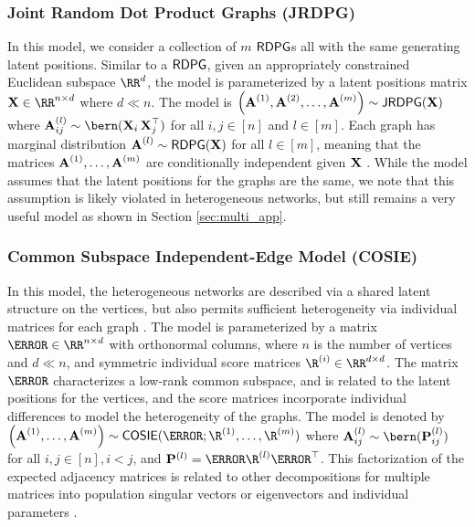 \subsubsection{Joint Random Dot Product Graphs (JRDPG)}
In this model, we consider a collection of $m$ $\operatorname{\mathsf{RDPG}}$s all with the same generating latent positions. Similar to a $\operatorname{\mathsf{RDPG}}$, given an appropriately constrained Euclidean subspace $\RR^d$, the model is parameterized by a latent positions matrix $\X\in\RR^{n\times d}$ where $d \ll n$. The model is $\left(\operatorname{\mathbf{A}}^{(1)}, \operatorname{\mathbf{A}}^{(2)}, \ldots, \operatorname{\mathbf{A}}^{(m)}\right)\sim \operatorname{\mathsf{JRDPG}}(\operatorname{\mathbf{X}})$ where $\A_{ij}^{(l)}\sim \bern(\X_i\X_j^\top)$ for all $i, j \in [n]$ and $l\in [m]$. Each graph has marginal distribution $\operatorname{\mathbf{A}}^{(l)}\sim\operatorname{\mathsf{RDPG}}(\operatorname{\mathbf{X}})$ for all $l \in [m]$, meaning that the matrices $\operatorname{\mathbf{A}}^{(1)}, \ldots,\operatorname{\mathbf{A}}^{(m)}$ are conditionally independent given $\operatorname{\mathbf{X}}$ \cite{athreya2017statistical,levin2017central}. While the model assumes that the latent positions for the graphs are the same, we note that this assumption is likely violated in heterogeneous networks, but still remains a very useful model as shown in Section \ref{sec:multi_app}.

\subsubsection{Common Subspace Independent-Edge Model (COSIE)} \label{sec:cosie}
In this model, the heterogeneous networks are described via a shared latent structure on the vertices, but also permits sufficient heterogeneity via individual matrices for each graph  \cite{arroyo2019inference}.
The model is parameterized by a  matrix $\V\in\RR^{n\times d}$ with orthonormal columns, 
where $n$ is the number of vertices and $d\ll n$, and  symmetric individual score matrices $\R^{(i)}\in\RR^{d\times d}$. The matrix $\V$ characterizes a low-rank common subspace, and is related to the latent positions for the vertices, and the score matrices incorporate individual differences to model the heterogeneity of the graphs. The model is denoted by $\left(\A^{(1)}, \ldots, \A^{(m)}\right)\sim \cosie(\V; \R^{(1)}, \ldots, \R^{(m)})$ where $\A_{ij}^{(l)} \sim \bern(\mathbf{P}^{(l)}_{ij})$ for all $i, j\in [n], i < j$, and $\mathbf{P}^{(l)}=\V\R^{(l)}\V^\top$. This factorization of the expected adjacency matrices is related to other decompositions for multiple matrices into population singular vectors or eigenvectors and individual parameters \cite{afshin2012enhancing,crainiceanu2011population,lock2013joint,wang2019common}.


